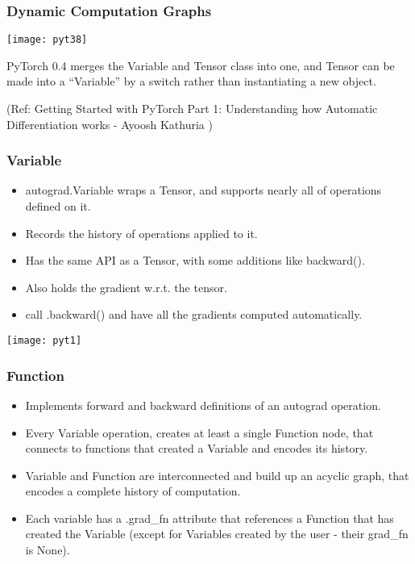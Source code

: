 \begin{frame}[fragile] \frametitle{Dynamic Computation Graphs}

\begin{center}
\texttt{[image: pyt38]}
\end{center}
PyTorch 0.4 merges the Variable and Tensor class into one, and Tensor can be made into a “Variable” by a switch rather than instantiating a new object. 

{\tiny (Ref: Getting Started with PyTorch Part 1: Understanding how Automatic Differentiation works - Ayoosh Kathuria )}
\end{frame}


\begin{frame}[fragile] \frametitle{Variable}
\begin{itemize}
\item autograd.Variable wraps a Tensor, and supports nearly all of operations defined on it.
\item Records the history of operations applied to it. 
\item Has the same API as a Tensor, with some additions like backward(). 
\item Also holds the gradient w.r.t. the tensor.
\item call .backward() and have all the gradients computed automatically.
\end{itemize}
\begin{center}
\texttt{[image: pyt1]}
\end{center}
\end{frame}

\begin{frame}[fragile] \frametitle{Function}
\begin{itemize}
\item Implements forward and backward definitions of an autograd operation. 
\item Every Variable operation, creates at least a single Function node, that connects to functions that created a Variable and encodes its history.
\item Variable and Function are interconnected and build up an acyclic graph, that encodes a complete history of computation.
\item Each variable has a .grad\_fn attribute that references a Function that has created the Variable (except for Variables created by the user - their grad\_fn is None).
\end{itemize}
\end{frame}



